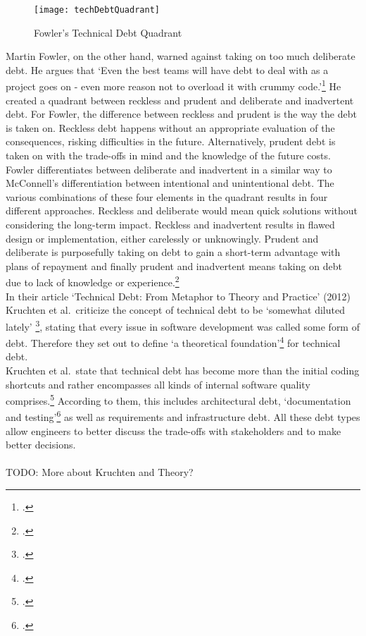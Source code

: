 \begin{figure}[H]
    \centering
    \caption[]{Fowler's Technical Debt Quadrant}
    \label{fig:technicaldebtquadrant}
    \texttt{[image: techDebtQuadrant]}
\end{figure}
Martin Fowler, on the other hand, warned against taking on too much deliberate debt. He argues that `Even the best teams will have debt to deal with as a project goes on - even more reason not to overload it with crummy code.'\footcite{fowlerTechnicalDebtQuadrant2009}
He created a quadrant between reckless and prudent and deliberate and inadvertent debt. For Fowler, the difference between reckless and prudent is the way the debt is taken on. Reckless debt happens without an appropriate evaluation of the consequences, risking difficulties in the future. Alternatively, prudent debt is taken on
with the trade-offs in mind and the knowledge of the future costs. Fowler differentiates between deliberate and inadvertent in a similar way to McConnell's differentiation between intentional and unintentional debt.
The various combinations of these four elements in the quadrant results in four different approaches. Reckless and deliberate would mean quick solutions without considering the long-term impact. Reckless and inadvertent results in flawed design or implementation, either carelessly or unknowingly. 
Prudent and deliberate is purposefully taking on debt to gain a short-term advantage with plans of repayment and finally prudent and inadvertent means taking on debt due to lack of knowledge or experience.\footcite{fowlerTechnicalDebtQuadrant2009}\\

In their article `Technical Debt: From Metaphor to Theory and Practice' (2012) Kruchten et al.\ criticize the concept of technical debt to be `somewhat diluted lately' \footcite[18]{kruchtenTechnicalDebtMetaphor2012}, stating that every issue in software development was called some form of debt. 
Therefore they set out to define `a theoretical foundation'\footcite[19]{kruchtenTechnicalDebtMetaphor2012} for technical debt.\\
Kruchten et al.\ state that technical debt has become more than the initial coding shortcuts and rather encompasses all kinds of internal software quality comprises.\footcite[19]{kruchtenTechnicalDebtMetaphor2012}
According to them, this includes architectural debt, `documentation and testing'\footcite[20]{kruchtenTechnicalDebtMetaphor2012} as well as requirements and infrastructure debt.
All these debt types allow engineers to better discuss the trade-offs with stakeholders and to make better decisions.\\
\\TODO: More about Kruchten and Theory?

